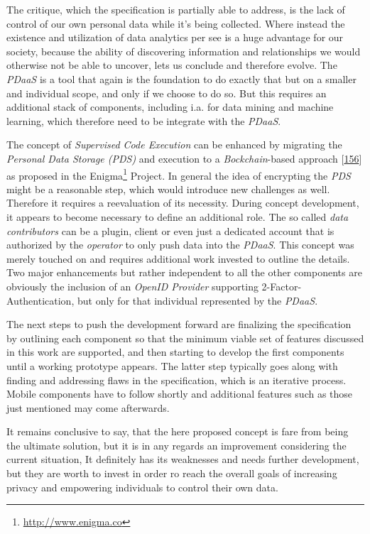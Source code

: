 \documentclass[12pt,english,a4paper,titlepage,cleardoublepage=empty,dottedtoc]{report}
\renewcommand{\href}[2]{#2\footnote{\url{#1}}}
\begin{document}
The critique, which the specification is partially able to address, is
the lack of control of our own personal data while it's being collected.
Where instead the existence and utilization of data analytics per see is
a huge advantage for our society, because the ability of discovering
information and relationships we would otherwise not be able to uncover,
lets us conclude and therefore evolve. The \emph{PDaaS} is a tool that
again is the foundation to do exactly that but on a smaller and
individual scope, and only if we choose to do so. But this requires an
additional stack of components, including i.a. for data mining and
machine learning, which therefore need to be integrate with the
\emph{PDaaS}.

The concept of \emph{Supervised Code Execution} can be enhanced by
migrating the \emph{Personal Data Storage (PDS)} and execution to a
\emph{Bockchain}-based approach
{[}\protect\hyperlink{ref-paper_2015_decentralizing-privacy-using-blockchain-to-protect-personal-data}{156}{]}
as proposed in the \href{http://www.enigma.co}{Enigma} Project. In
general the idea of encrypting the \emph{PDS} might be a reasonable
step, which would introduce new challenges as well. Therefore it
requires a reevaluation of its necessity. During concept development, it
appears to become necessary to define an additional role. The so called
\emph{data contributors} can be a plugin, client or even just a
dedicated account that is authorized by the \emph{operator} to only push
data into the \emph{PDaaS}. This concept was merely touched on and
requires additional work invested to outline the details. Two major
enhancements but rather independent to all the other components are
obviously the inclusion of an \emph{OpenID Provider} supporting
2-Factor-Authentication, but only for that individual represented by the
\emph{PDaaS}.

The next steps to push the development forward are finalizing the
specification by outlining each component so that the minimum viable set
of features discussed in this work are supported, and then starting to
develop the first components until a working prototype appears. The
latter step typically goes along with finding and addressing flaws in
the specification, which is an iterative process. Mobile components have
to follow shortly and additional features such as those just mentioned
may come afterwards.

It remains conclusive to say, that the here proposed concept is fare
from being the ultimate solution, but it is in any regards an
improvement considering the current situation, It definitely has its
weaknesses and needs further development, but they are worth to invest
in order ro reach the overall goals of increasing privacy and empowering
individuals to control their own data.
\end{document}
